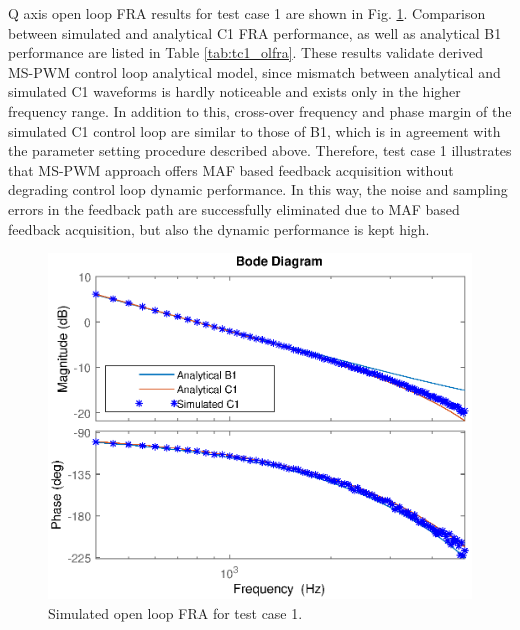 \documentclass[journal]{IEEEtran}
\begin{document}
Q axis open loop FRA results for test case 1 are shown in Fig. \ref{fig:tc1_olfra}.  Comparison between simulated and analytical C1 FRA performance, as well as analytical B1 performance are listed in Table \ref{tab:tc1_olfra}. These results validate derived MS-PWM control loop analytical model, since mismatch between analytical and simulated C1 waveforms is hardly noticeable and exists only in the higher frequency range. In addition to this, cross-over frequency and phase margin of the simulated C1 control loop are similar to those of B1, which is in agreement with the parameter setting procedure described above. Therefore, test case 1 illustrates that MS-PWM approach offers MAF based feedback acquisition without degrading control loop dynamic performance. In this way, the noise and sampling errors in the feedback path are successfully eliminated due to MAF based feedback acquisition, but also the dynamic performance is kept high. \par

\begin{figure}[t!]
    \centerline{\includegraphics[width=0.95\linewidth]{figures/tc1_olfra.eps}}
    \caption{Simulated open loop FRA for test case 1.}
    \label{fig:tc1_olfra} 
\end{figure}
\end{document}
